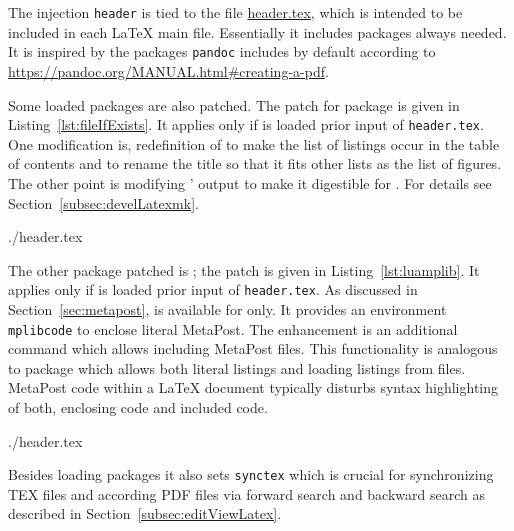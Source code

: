 The injection \texttt{header} 
is tied to the file \href{\urlSite fromTex/header.tex}{header.tex}, 
which is intended to be included in each \LaTeX{} main file. 
Essentially it includes packages always needed. 
It is inspired by the packages \texttt{pandoc} includes by default 
according to \url{https://pandoc.org/MANUAL.html#creating-a-pdf}. 

Some loaded packages are also patched. 
The patch for package  is given in Listing~\ref{lst:fileIfExists}. 
It applies only if  is loaded prior input of \texttt{header.tex}. 
One modification is, redefinition of  
to make the list of listings occur in the table of contents 
and to rename the title so that it fits other lists as the list of figures.  
The other point is modifying ' output to make it digestible for . 
For details see Section~\ref{subsec:develLatexmk}. 

%
{./header.tex}%


The other package patched is ; the patch is given in Listing~\ref{lst:luamplib}. 
It applies only if  is loaded prior input of \texttt{header.tex}. 
As discussed in Section~\ref{sec:metapost}, 
 is available for \lualatex{} only. 
It provides an environment \texttt{mplibcode} to enclose literal MetaPost. 
The enhancement is an additional command  
which allows including MetaPost files. 
This functionality is analogous to package  
which allows both literal listings and loading listings from files. 
MetaPost code within a \LaTeX{} document typically disturbs syntax highlighting 
of both, enclosing code and included code. 

%

{./header.tex}%

Besides loading packages it also sets \texttt{synctex} 
which is crucial for synchronizing TEX files and according PDF files 
via forward search and backward search 
as described in Section~\ref{subsec:editViewLatex}. 


